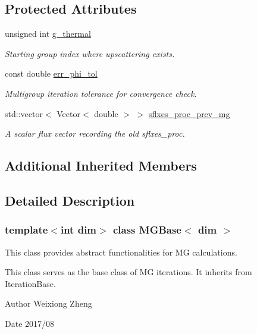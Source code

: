 \subsection*{Protected Attributes}
\begin{DoxyCompactItemize}
\item 
unsigned int \hyperlink{class_m_g_base_a7df1f6ce51cf6eb033420be98b1f0019}{g\+\_\+thermal}
\begin{DoxyCompactList}\small\item\em Starting group index where upscattering exists. \end{DoxyCompactList}\item 
const double \hyperlink{class_m_g_base_af50b1bdc92270c342524eacfc644170c}{err\+\_\+phi\+\_\+tol}
\begin{DoxyCompactList}\small\item\em Multigroup iteration tolerance for convergence check. \end{DoxyCompactList}\item 
std\+::vector$<$ Vector$<$ double $>$ $>$ \hyperlink{class_m_g_base_ad8a9d4163bb31470fff74fe787c23788}{sflxes\+\_\+proc\+\_\+prev\+\_\+mg}
\begin{DoxyCompactList}\small\item\em A scalar flux vector recording the old sflxes\+\_\+proc. \end{DoxyCompactList}\end{DoxyCompactItemize}
\subsection*{Additional Inherited Members}


\subsection{Detailed Description}
\subsubsection*{template$<$int dim$>$\newline
class M\+G\+Base$<$ dim $>$}

This class provides abstract functionalities for MG calculations. 

This class serves as the base class of MG iterations. It inherits from Iteration\+Base.

\begin{DoxyAuthor}{Author}
Weixiong Zheng 
\end{DoxyAuthor}
\begin{DoxyDate}{Date}
2017/08 
\end{DoxyDate}



